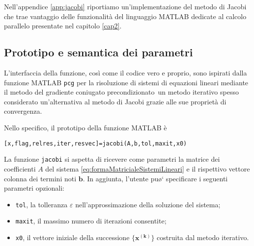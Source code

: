 Nell'appendice \ref{app:jacobi} riportiamo un'implementazione del metodo di Jacobi che trae vantaggio delle funzionalit\`a del linguaggio MATLAB dedicate al 
calcolo parallelo presentate nel capitolo \ref{cap2}.

\subsection{Prototipo e semantica dei parametri}
L'interfaccia della funzione, cos\`i come il codice vero e proprio, sono ispirati dalla funzione MATLAB 
\lstinline|pcg| per la risoluzione di sistemi di equazioni lineari mediante il metodo del gradiente coniugato precondizionato\,\cite{MathWorksPCG} 
un metodo iterativo spesso considerato un'alternativa al metodo di Jacobi grazie alle sue propriet\`a di convergenza.

Nello specifico, il prototipo della funzione MATLAB \`e
\begin{lstlisting}
[x,flag,relres,iter,resvec]=jacobi(A,b,tol,maxit,x0)
\end{lstlisting}
La funzione \lstinline|jacobi| si aspetta di ricevere come parametri la matrice dei coefficienti $A$ del sistema \eqref{eq:formaMatricialeSistemiLineari} e il rispettivo vettore colonna dei termini noti $\mathbf{b}$.\newline
In aggiunta, l'utente pu\o` specificare i seguenti parametri opzionali:
\begin{itemize}
    \item \lstinline|tol|, la tolleranza $\varepsilon$ nell'approssimazione della soluzione del sistema;
    \item \lstinline|maxit|, il massimo numero di iterazioni consentite;
    \item \lstinline|x0|, il vettore iniziale della successione $\mathbf{\{x^{(k)}\}}$ costruita dal metodo iterativo.
\end{itemize}

